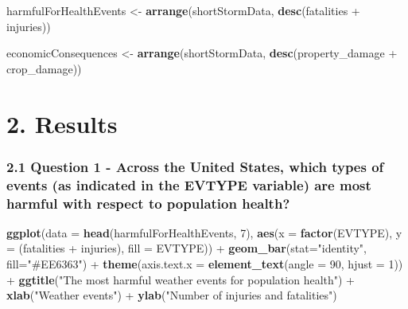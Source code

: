 \documentclass[]{article}
\newenvironment{Shaded}{\begin{snugshade}}{\end{snugshade}}
\newcommand{\KeywordTok}[1]{\textcolor[rgb]{0.13,0.29,0.53}{\textbf{{#1}}}}
\newcommand{\DataTypeTok}[1]{\textcolor[rgb]{0.13,0.29,0.53}{{#1}}}
\newcommand{\DecValTok}[1]{\textcolor[rgb]{0.00,0.00,0.81}{{#1}}}
\newcommand{\StringTok}[1]{\textcolor[rgb]{0.31,0.60,0.02}{{#1}}}
\newcommand{\NormalTok}[1]{{#1}}
\begin{document}
\begin{Shaded}
\begin{Highlighting}[]
\NormalTok{harmfulForHealthEvents <-}\StringTok{ }\KeywordTok{arrange}\NormalTok{(shortStormData, }\KeywordTok{desc}\NormalTok{(fatalities +}\StringTok{ }\NormalTok{injuries))}
\end{Highlighting}
\end{Shaded}

\begin{Shaded}
\begin{Highlighting}[]
\NormalTok{economicConsequences <-}\StringTok{ }\KeywordTok{arrange}\NormalTok{(shortStormData, }\KeywordTok{desc}\NormalTok{(property_damage +}\StringTok{ }\NormalTok{crop_damage))}
\end{Highlighting}
\end{Shaded}

\section{2. Results}\label{results}

\subsubsection{2.1 Question 1 - Across the United States, which types of
events (as indicated in the EVTYPE variable) are most harmful with
respect to population
health?}\label{question-1---across-the-united-states-which-types-of-events-as-indicated-in-the-evtype-variable-are-most-harmful-with-respect-to-population-health}

\begin{Shaded}
\begin{Highlighting}[]
\KeywordTok{ggplot}\NormalTok{(}\DataTypeTok{data =} \KeywordTok{head}\NormalTok{(harmfulForHealthEvents, }\DecValTok{7}\NormalTok{), }
       \KeywordTok{aes}\NormalTok{(}\DataTypeTok{x =} \KeywordTok{factor}\NormalTok{(EVTYPE), }
           \DataTypeTok{y =} \NormalTok{(fatalities +}\StringTok{ }\NormalTok{injuries), }
           \DataTypeTok{fill =} \NormalTok{EVTYPE)) +}\StringTok{ }
\StringTok{  }\KeywordTok{geom_bar}\NormalTok{(}\DataTypeTok{stat=}\StringTok{"identity"}\NormalTok{, }
           \DataTypeTok{fill=}\StringTok{"#EE6363"}\NormalTok{) +}\StringTok{ }
\StringTok{  }\KeywordTok{theme}\NormalTok{(}\DataTypeTok{axis.text.x =} \KeywordTok{element_text}\NormalTok{(}\DataTypeTok{angle =} \DecValTok{90}\NormalTok{, }
                                   \DataTypeTok{hjust =} \DecValTok{1}\NormalTok{)) +}\StringTok{ }
\StringTok{  }\KeywordTok{ggtitle}\NormalTok{(}\StringTok{"The most harmful weather events for population health"}\NormalTok{) +}\StringTok{ }
\StringTok{  }\KeywordTok{xlab}\NormalTok{(}\StringTok{"Weather events"}\NormalTok{) +}\StringTok{ }
\StringTok{  }\KeywordTok{ylab}\NormalTok{(}\StringTok{"Number of injuries and fatalities"}\NormalTok{)}
\end{Highlighting}
\end{Shaded}
\end{document}
